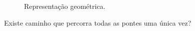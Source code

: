 \begin{easylist}
\begin{figure}[!h]
\begin{subfigure}{.5\textwidth}
\begin{tabular}{c}
    \end{tabular}
    \caption{\label{fig:kon:graph} Representação geométrica.}
  \end{subfigure}
  \caption{\label{fig:gray} Existe caminho que percorra todas as pontes uma única vez?}
\end{figure}






















  

  
\end{easylist}



